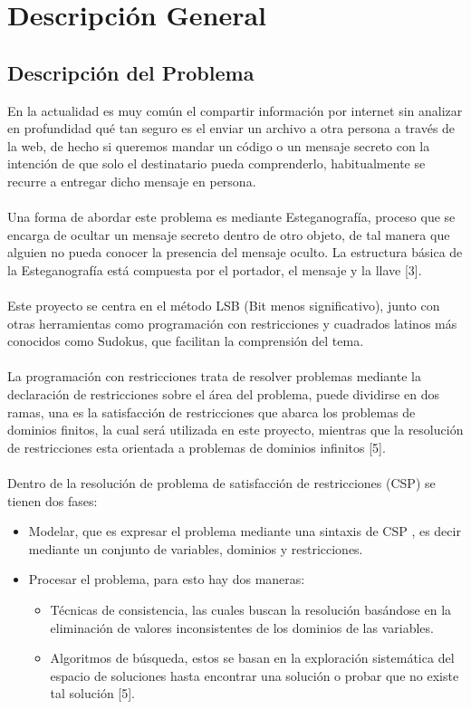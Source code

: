 \documentclass[14pt]{article}
\begin{document}
\newpage
	\section{Descripción General}
	\subsection{Descripción del Problema}
En la actualidad es muy común el compartir información por internet sin analizar en profundidad qué tan seguro es el enviar un archivo a otra persona a través de la web, de hecho si queremos mandar un código o un mensaje secreto con la intención de que solo el  destinatario pueda comprenderlo, habitualmente se recurre a entregar dicho mensaje en persona.
		\\~\\
Una forma de abordar este problema es mediante Esteganografía, proceso que se encarga de ocultar un mensaje secreto dentro de otro objeto, de tal manera que alguien no pueda conocer la presencia del mensaje oculto. La estructura básica de la Esteganografía está compuesta por el portador, el mensaje y la llave [3].
		\\~\\
Este proyecto se centra en el método LSB (Bit menos significativo), junto con otras herramientas como programación con restricciones y cuadrados latinos más conocidos como Sudokus, que facilitan la comprensión del tema.
		\\~\\
La programación con restricciones trata de resolver problemas mediante la declaración de restricciones sobre el área del problema, puede dividirse en dos ramas, una es la satisfacción de restricciones que abarca los problemas de dominios finitos, la cual será utilizada en este proyecto, mientras que la resolución de restricciones esta orientada a problemas de dominios infinitos [5].
		\\~\\
Dentro de  la resolución de problema de satisfacción de restricciones (CSP) se tienen dos fases:
\begin{itemize}
	\item Modelar, que es expresar el problema mediante una sintaxis de CSP , es decir mediante un conjunto de variables, dominios y restricciones.
\end{itemize}

\begin{itemize}
	\item Procesar el problema, para esto hay dos maneras:
				\begin{itemize}
						\item Técnicas de consistencia, las cuales buscan la resolución basándose en la eliminación de valores inconsistentes de los dominios  de las variables.
				\end{itemize}
				\begin{itemize}
						\item Algoritmos de búsqueda, estos se basan en la exploración sistemática del espacio de soluciones hasta encontrar una solución o probar que no existe tal solución [5].
				\end{itemize}
\end{itemize}
		
\end{document}
